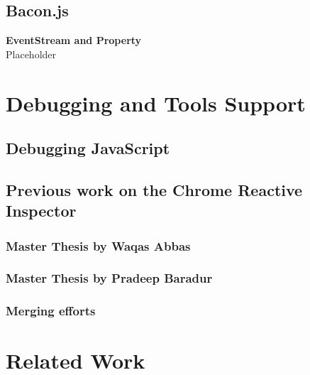 \subsection{Bacon.js}

\textbf{EventStream and Property}\\
Placeholder

\section{Debugging and Tools Support}

\subsection{Debugging JavaScript}

\subsection{Previous work on the Chrome Reactive Inspector}
	\subsubsection{Master Thesis by Waqas Abbas}
	\subsubsection{Master Thesis by Pradeep Baradur}
	\subsubsection{Merging efforts}

\section{Related Work}
